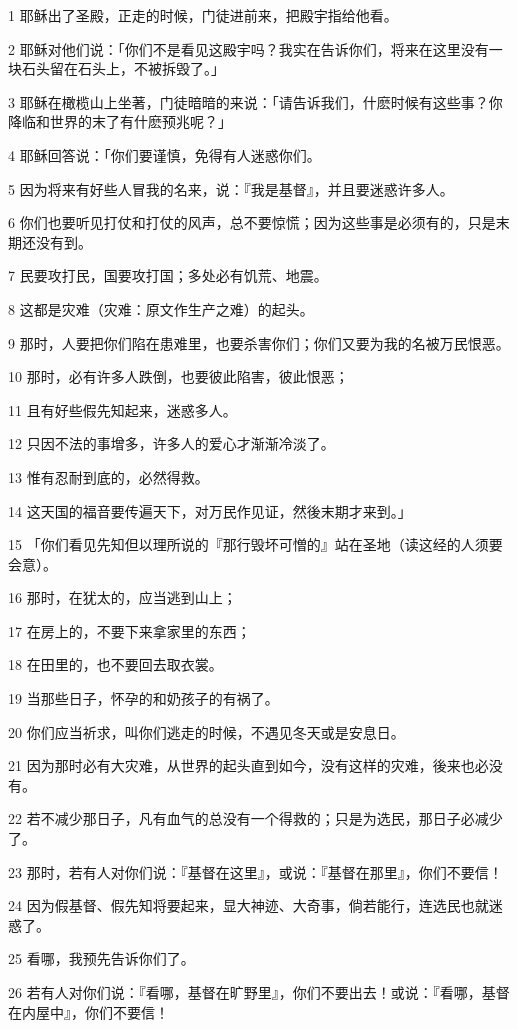 \par 1 耶稣出了圣殿，正走的时候，门徒进前来，把殿宇指给他看。
\par 2 耶稣对他们说：「你们不是看见这殿宇吗？我实在告诉你们，将来在这里没有一块石头留在石头上，不被拆毁了。」
\par 3 耶稣在橄榄山上坐著，门徒暗暗的来说：「请告诉我们，什麽时候有这些事？你降临和世界的末了有什麽预兆呢？」
\par 4 耶稣回答说：「你们要谨慎，免得有人迷惑你们。
\par 5 因为将来有好些人冒我的名来，说：『我是基督』，并且要迷惑许多人。
\par 6 你们也要听见打仗和打仗的风声，总不要惊慌；因为这些事是必须有的，只是末期还没有到。
\par 7 民要攻打民，国要攻打国；多处必有饥荒、地震。
\par 8 这都是灾难（灾难：原文作生产之难）的起头。
\par 9 那时，人要把你们陷在患难里，也要杀害你们；你们又要为我的名被万民恨恶。
\par 10 那时，必有许多人跌倒，也要彼此陷害，彼此恨恶；
\par 11 且有好些假先知起来，迷惑多人。
\par 12 只因不法的事增多，许多人的爱心才渐渐冷淡了。
\par 13 惟有忍耐到底的，必然得救。
\par 14 这天国的福音要传遍天下，对万民作见证，然後末期才来到。」
\par 15 「你们看见先知但以理所说的『那行毁坏可憎的』站在圣地（读这经的人须要会意）。
\par 16 那时，在犹太的，应当逃到山上；
\par 17 在房上的，不要下来拿家里的东西；
\par 18 在田里的，也不要回去取衣裳。
\par 19 当那些日子，怀孕的和奶孩子的有祸了。
\par 20 你们应当祈求，叫你们逃走的时候，不遇见冬天或是安息日。
\par 21 因为那时必有大灾难，从世界的起头直到如今，没有这样的灾难，後来也必没有。
\par 22 若不减少那日子，凡有血气的总没有一个得救的；只是为选民，那日子必减少了。
\par 23 那时，若有人对你们说：『基督在这里』，或说：『基督在那里』，你们不要信！
\par 24 因为假基督、假先知将要起来，显大神迹、大奇事，倘若能行，连选民也就迷惑了。
\par 25 看哪，我预先告诉你们了。
\par 26 若有人对你们说：『看哪，基督在旷野里』，你们不要出去！或说：『看哪，基督在内屋中』，你们不要信！

